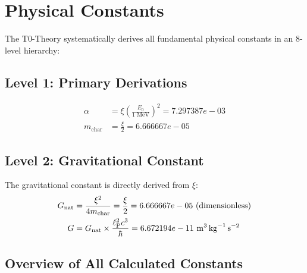 \documentclass[11pt,a4paper]{article}
\begin{document}
\section{Physical Constants}

The T0-Theory systematically derives all fundamental physical constants in an 8-level hierarchy:

\subsection{Level 1: Primary Derivations}
\begin{align}
\alpha &= \xi \left(\frac{E_0}{1 \text{ MeV}}\right)^2 = 7.297387e-03 \\
m_{\text{char}} &= \frac{\xi}{2} = 6.666667e-05
\end{align}

\subsection{Level 2: Gravitational Constant}

The gravitational constant is directly derived from $\xi$:
\begin{align}
G_{\text{nat}} &= \frac{\xi^2}{4 m_{\text{char}}} = \frac{\xi}{2} = 6.666667e-05 \text{ (dimensionless)} \\
G &= G_{\text{nat}} \times \frac{\ell_\text{P}^2 c^3}{\hbar} = 6.672194e-11 \text{ \si{\cubic\meter\per\kilogram\per\second\squared}}
\end{align}

\subsection{Overview of All Calculated Constants}
\end{document}
